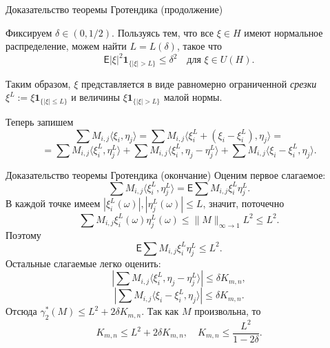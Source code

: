 \documentclass[handout]{beamer}
\renewcommand\le{\leqslant}
\newcommand\E{\mathsf E}
\begin{document}
\begin{frame}{Доказательство теоремы Гротендика (продолжение)}

    Фиксируем $\delta\in(0,1/2)$. Пользуясь тем, что все $\xi\in H$ имеют
    нормальное распределение, можем найти $L=L(\delta)$, такое что
    $$
    \E |\xi|^2\mathbf{1}_{\{|\xi|>L\}} \le \delta^2\quad\mbox{для $\xi\in
    U(H)$.}
    $$
    \pause\vspace{5pt}

    Таким образом, $\xi$ представляется в виде равномерно ограниченной
    \textit{срезки} $\xi^L := \xi \mathbf{1}_{\{|\xi|\le L\}}$ и величины 
    $\xi \mathbf{1}_{\{|\xi|> L\}}$ малой нормы.
    \pause\vspace{5pt}
    
    Теперь запишем
    $$
    \sum M_{i,j}\langle \xi_i,\eta_j\rangle = 
        \sum M_{i,j}\langle \xi_i^L + (\xi_i-\xi_i^L),\eta_j\rangle = 
        $$
        \pause
        $$
        = \sum M_{i,j}\langle \xi_i^L,\eta_j^L\rangle + \sum
        M_{i,j}\langle\xi_i^L,\eta_j-\eta_j^L\rangle +
        \sum M_{i,j}\langle \xi_i-\xi_i^L,\eta_j\rangle.
    $$

\end{frame}


\begin{frame}{Доказательство теоремы Гротендика (окончание)}
    Оценим первое слагаемое:
    $$
        \sum M_{i,j}\langle \xi_i^L,\eta_j^L\rangle  = \E \sum
        M_{i,j}\xi_i^L \eta_j^L.
    $$
    \pause
    В каждой точке имеем $|\xi_i^L(\omega)|, |\eta_j^L(\omega)|\le L$, 
    значит, поточечно
    $$
    \sum M_{i,j}\xi_i^L(\omega)\eta_j^L(\omega) \le \|M\|_{\infty\to1} L^2 \le
    L^2.
    $$
    \pause
    Поэтому
    $$
    \E \sum M_{i,j}\xi_i^L\eta_j^L \le L^2.
    $$
    \pause
    Остальные слагаемые легко оценить:
    $$
        |\sum M_{i,j}\langle\xi_i^L,\eta_j-\eta_j^L\rangle| \le \delta K_{m,n},
    $$
    $$
        |\sum M_{i,j}\langle \xi_i-\xi_i^L,\eta_j\rangle| \le \delta K_{m,n}.
    $$
    \pause
    Отсюда $\gamma_2^*(M) \le L^2 + 2\delta K_{m,n}$. Так как $M$ произвольна, то
    $$
    K_{m,n} \le L^2 + 2\delta K_{m,n},\quad K_{m,n} \le \frac{L^2}{1-2\delta}.
    $$

\end{frame}
\end{document}
